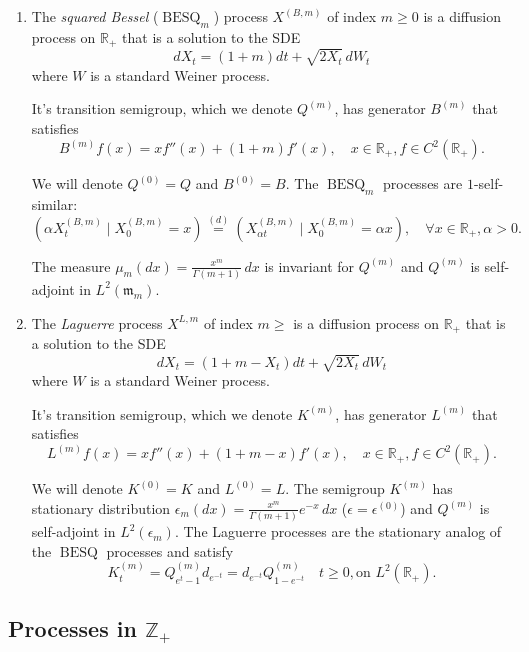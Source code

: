 \documentclass[11pt,a4,reqno]{amsart}
\numberwithin{equation}{section}
\theoremstyle{definition}
\theoremstyle{remark}
\newcommand{\bb}[1]{\mathbb{#1}}
\newcommand{\frk}[1]{\mathfrak{#1}}
\newcommand{\R}{\bb{R}}
\newcommand{\Z}{\bb{Z}}
\DeclareMathOperator{\besq}{BESQ}
\newcommand{\beq}{\begin{equation}}
\newcommand{\eeq}{\end{equation}}
\begin{document}
	\begin{enumerate}
	
		\item The \textit{squared Bessel} ($\besq_m$) process $X^{(B, m)}$ of index $m \geq 0$ is a diffusion process on $\R_+$ that is a solution to the SDE
		\beq dX_t = (1 + m) dt + \sqrt{2X_t} \, dW_t \eeq
		where $W$ is a standard Weiner process. 
		
		It's transition semigroup, which we denote $Q^{(m)}$, has generator $B^{(m)}$ that satisfies
		\beq B^{(m)}f(x) = x f''(x) + (1 + m) f'(x), \quad x \in \R_+, f \in C^2(\R_+). \eeq
		
		We will denote $Q^{(0)} = Q$ and $B^{(0)} = B$. The $\besq_m$ processes are $1$-self-similar:
		\beq \label{eqn:self_similar_besq} ( \alpha X_t^{(B, m)} \mid X_0^{(B, m)} = x) \overset{(d)}{=} (X_{\alpha t}^{(B, m)} \mid X_0^{(B, m)} = \alpha x), \quad \forall x \in \R_+, \alpha > 0 . \eeq
		
		The measure $\mu_m(dx) = \frac{x^m}{\Gamma(m + 1)} \, dx$ is invariant for $Q^{(m)}$ and $Q^{(m)}$ is self-adjoint in $L^2(\frk{m}_m)$.
		
		\item The \textit{Laguerre} process $X^{L, m}$ of index $m \geq $ is a diffusion process on $\R_+$ that is a solution to the SDE 
		\beq dX_t = (1 + m - X_t) dt + \sqrt{2X_t} \, dW_t \eeq
		where $W$ is a standard Weiner process. 
		
		It's transition semigroup, which we denote $K^{(m)}$, has generator $L^{(m)}$ that satisfies
		\beq L^{(m)}f(x) = x f''(x) + (1 + m - x) f'(x), \quad x \in \R_+, f \in C^2(\R_+). \eeq
		
		We will denote $K^{(0)} = K$ and $L^{(0)} = L$. The semigroup $K^{(m)}$ has stationary distribution $\epsilon_m(dx) = \frac{x^m}{\Gamma(m + 1)} e^{-x} \, dx$ ($\epsilon = \epsilon^{(0)}$) and $Q^{(m)}$ is self-adjoint in $L^2(\epsilon_m)$. The Laguerre processes are the stationary analog of the $\besq$ processes and satisfy 
		\beq \label{eqn:besq_lag} K^{(m)}_t = Q_{e^t - 1}^{(m)} d_{e^{-t}} = d_{e^{-t}} Q_{1 - e^{-t}}^{(m)} \quad t \geq 0, \text{on } L^2(\R_+) . \eeq
		
	\end{enumerate}
	
	
\subsection{Processes in $\Z_+$}
\end{document}
